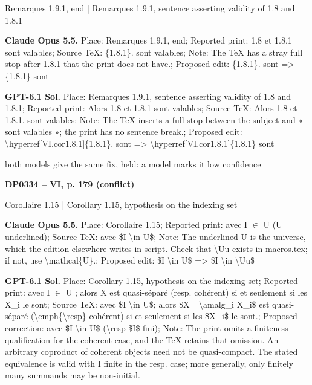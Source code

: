 Remarques 1.9.1, end | Remarques 1.9.1, sentence asserting validity of 1.8 and 1.8.1\par
\textbf{Claude Opus 5.5.} Place: Remarques 1.9.1, end; Reported print: 1.8 et 1.8.1 sont valables; Source TeX: \{1.8.1\}. sont valables; Note: The TeX has a stray full stop after 1.8.1 that the print does not have.; Proposed edit: \{1.8.1\}. sont =\allowbreak > \{1.8.1\} sont\par
\textbf{GPT-6.1 Sol.} Place: Remarques 1.9.1, sentence asserting validity of 1.8 and 1.8.1; Reported print: Alors 1.8 et 1.8.1 sont valables; Source TeX: Alors 1.8 et 1.8.1. sont valables; Note: The TeX inserts a full stop between the subject and « sont valables »; the print has no sentence break.; Proposed edit: \textbackslash{}hyperref[VI.cor1.8.1]\{1.8.1\}. sont =\allowbreak > \textbackslash{}hyperref[VI.cor1.8.1]\{1.8.1\} sont\par
both models give the same fix, held: a model marks it low confidence\par
\par\noindent\hypertarget{DP0334}{}\textbf{DP0334 -- VI, p. 179 (conflict)}\par
Corollaire 1.15 | Corollary 1.15, hypothesis on the indexing set\par
\textbf{Claude Opus 5.5.} Place: Corollaire 1.15; Reported print: avec I \ensuremath{\in} U (U underlined); Source TeX: avec \$I \textbackslash{}in U\$; Note: The underlined U is the universe, which the edition elsewhere writes in script. Check that \textbackslash{}Uu exists in macros.tex; if not, use \textbackslash{}mathcal\{U\}.; Proposed edit: \$I \textbackslash{}in U\$ =\allowbreak > \$I \textbackslash{}in \textbackslash{}Uu\$\par
\textbf{GPT-6.1 Sol.} Place: Corollary 1.15, hypothesis on the indexing set; Reported print: avec I \ensuremath{\in} U ; alors X est quasi-séparé (resp. cohérent) si et seulement si les X\_i le sont; Source TeX: avec \$I \textbackslash{}in U\$; alors \$X =\allowbreak  \textbackslash{}amalg\_i X\_i\$ est quasi-séparé (\textbackslash{}emph\{\textbackslash{}resp\} cohérent) si et seulement si les \$X\_i\$ le sont.; Proposed correction: avec \$I \textbackslash{}in U\$ (\textbackslash{}resp \$I\$ fini); Note: The print omits a finiteness qualification for the coherent case, and the TeX retains that omission. An arbitrary coproduct of coherent objects need not be quasi-compact. The stated equivalence is valid with I finite in the resp. case; more generally, only finitely many summands may be non-initial.\par
